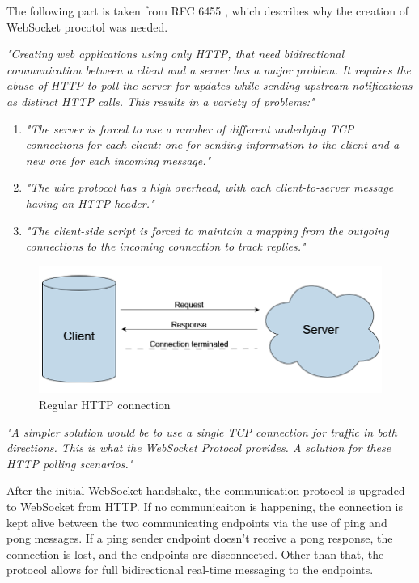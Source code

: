 	The following part is taken from RFC 6455 \cite{websocket}, which describes why the creation of WebSocket procotol was needed.

	\textit{
		"Creating web applications using only HTTP, that need bidirectional
		communication between a client and a server has a major problem. 
		It requires the abuse of HTTP to poll the
		server for updates while sending upstream notifications as distinct
		HTTP calls.
		This results in a variety of problems:"
	}
	\begin{enumerate}
		\item \textit{"The server is forced to use a number of different underlying TCP
		connections for each client: one for sending information to the
		client and a new one for each incoming message."}
		\item \textit{"The wire protocol has a high overhead, with each client-to-server
		message having an HTTP header."}
		\item \textit{"The client-side script is forced to maintain a mapping from the
		outgoing connections to the incoming connection to track replies."}
	\end{enumerate}

	\begin{figure}[h!]
		\includegraphics{include/imgs/http.PNG}
		\caption{Regular HTTP connection}
	\end{figure}

	\textit{"A simpler solution would be to use a single TCP connection for
	traffic in both directions. This is what the WebSocket Protocol
	provides. A solution for these HTTP polling scenarios."}

	After the initial WebSocket handshake, the communication protocol is upgraded to WebSocket from HTTP.
	If no communicaiton is happening, the connection is kept alive between the two communicating endpoints via the use of ping and pong messages.
	If a ping sender endpoint doesn't receive a pong response, the connection is lost, and the endpoints are disconnected.
	Other than that, the protocol allows for full bidirectional real-time messaging to the endpoints.

